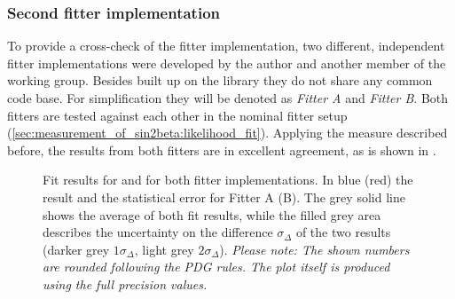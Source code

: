 \subsubsection{Second fitter implementation}
\label{sec:measurement_of_sin2beta:systematics:cross_checks:second_fitter}
%
To provide a cross-check of the fitter implementation, two different,
independent fitter implementations were developed by the author and another
member of the working group. Besides built up on the \RooFit library they do not
share any common code base. For simplification they will be denoted as
\emph{Fitter A} and \emph{Fitter B}. Both fitters are tested against each other
in the nominal fitter setup (\cref{sec:measurement_of_sin2beta:likelihood_fit}).
Applying the measure described before, the results from both fitters are in
excellent agreement, as is shown in
.
%
\begin{figure}
\centering


\caption{
Fit results for \SJpsiKS and \CJpsiKS for both fitter implementations.
In blue (red) the result and the statistical error for Fitter A (B). The
grey solid line shows the average of both fit results, while the filled grey
area describes the uncertainty on the difference $\sigma_\Delta$ of the two
results (darker grey $1\sigma_\Delta$, light grey $2\sigma_\Delta$).
\textit{Please note: The shown numbers are rounded following the PDG rules. The
plot itself is produced using the full precision values.} }
\label{fig:measurement_of_sin2beta:systematics:cross_checks:second_fitter}
\end{figure}

